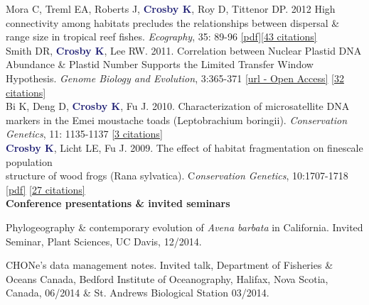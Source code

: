 \documentclass[a4paper,12pt,final]{memoir}
\newcommand{\SmallSep}{\vspace{0.5em}}
\newenvironment{Contact Information}
	{\ignorespaces\textbf{\color{MidnightBlue} Contact Information}}
	{\Sep\ignorespacesafterend}
\newcommand{\CVSection}[1]
	{\Large\textbf{#1}\par
	\SmallSep\normalsize\normalfont}
\begin{document}
Mora C, Treml EA, Roberts J, \textcolor{MidnightBlue}{\textbf{{Crosby K}}}, Roy D, Tittenor DP. 2012 High connectivity among habitats precludes the relationships between dispersal \& range size in tropical reef fishes. \textit{Ecography}, 35: 89-96 \href{http://www.researchgate.net/publication/227837454_High_connectivity_among_habitats_precludes_the_relationship_between_dispersal_and_range_size_in_tropical_reef_fishes/file/9c960528513ddcdf0e.pdf}{[pdf]}\href{http://scholar.google.com/scholar?oi=bibs&hl=en&cites=14910466386364676679&as_sdt=5}{[43 citations]}\\

Smith DR, \textcolor{MidnightBlue}{\textbf{{Crosby K}}}, Lee RW. 2011. Correlation between Nuclear Plastid DNA Abundance \& Plastid Number Supports the Limited Transfer Window Hypothesis. \textit{Genome Biology and Evolution}, 3:365-371 \href{http://gbe.oxfordjournals.org/content/3/365.long}{[url - Open Access]} \href{http://scholar.google.ca/scholar?oi=bibs&hl=en&cites=9373596750792333707&as_sdt=5}{[32 citations]}\\ 

Bi K, Deng D, \textcolor{MidnightBlue}{\textbf{{Crosby K}}}, Fu J. 2010. Characterization of microsatellite DNA markers in the Emei moustache toads (Leptobrachium boringii). \textit{Conservation Genetics}, 11: 1135-1137 \href{http://scholar.google.ca/scholar?oi=bibs&hl=en&cites=12162043784732384233&as_sdt=5}{[3 citations]}\\

\textcolor{MidnightBlue}{\textbf{{Crosby K}}}, Licht LE, Fu J. 2009. The effect of habitat fragmentation on finescale population \\structure of wood frogs (Rana sylvatica). C\textit{onservation Genetics}, 10:1707-1718 \href{https://www.researchgate.net/profile/Kate_Crosby/publication/226176241_The_effect_of_habitat_fragmentation_on_finescale_population_structure_of_wood_frogs_\%28Rana_sylvatica\%29/links/54988b9f0cf2eeefc30f9a4b.pdf?origin=publication_detail}{[pdf]} \href{http://scholar.google.ca/scholar?oi=bibs&hl=en&cites=3898347670072226343&as_sdt=5}{[27 citations]}\\

\CVSection{Conference presentations \& invited seminars}
Phylogeography \& contemporary evolution of \textit{Avena barbata} in California. Invited Seminar, Plant Sciences, UC Davis, 12/2014.
\SmallSep

CHONe's data management notes. Invited talk, Department of Fisheries \& Oceans Canada, Bedford Institute of Oceanography, Halifax, Nova Scotia, Canada, 06/2014 \& St. Andrews Biological Station 03/2014.
\SmallSep
\end{document}
